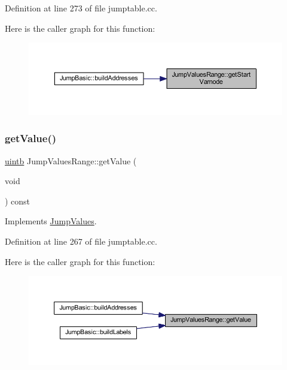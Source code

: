 Definition at line 273 of file jumptable.\+cc.

Here is the caller graph for this function\+:
\nopagebreak
\begin{figure}[H]
\begin{center}
\leavevmode
\includegraphics[width=350pt]{class_jump_values_range_a1652b9c2b1e6cedf3d80452cfe5aa37f_icgraph}
\end{center}
\end{figure}
\mbox{\label{class_jump_values_range_a5da91b687a50616c6a6a65f530c81590}} 
\subsubsection{\texorpdfstring{getValue()}{getValue()}}
{\footnotesize\ttfamily \mbox{\hyperlink{types_8h_a2db313c5d32a12b01d26ac9b3bca178f}{uintb}} Jump\+Values\+Range\+::get\+Value (\begin{DoxyParamCaption}\item[{void}]{ }\end{DoxyParamCaption}) const\hspace{0.3cm}{\ttfamily [virtual]}}



Implements \mbox{\hyperlink{class_jump_values_a152463d975b9364369d2036dafd59303}{Jump\+Values}}.



Definition at line 267 of file jumptable.\+cc.

Here is the caller graph for this function\+:
\nopagebreak
\begin{figure}[H]
\begin{center}
\leavevmode
\includegraphics[width=350pt]{class_jump_values_range_a5da91b687a50616c6a6a65f530c81590_icgraph}
\end{center}
\end{figure}
\mbox{\label{class_jump_values_range_a92e0970fd19cd188a82078752a10948d}} 
